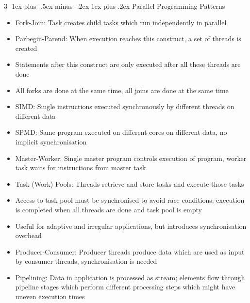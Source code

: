 \documentclass[10pt, landscape]{article}
\makeatletter
\renewcommand{\subsection}{\@startsection{subsection}{3}{0mm}%
                                {-1ex plus -.5ex minus -.2ex}%
                                {1ex plus .2ex}%
                                {\normalfont\small\bfseries}}%
\makeatother
\begin{document}
\begin{multicols*}{3}
\subsection{Parallel Programming Patterns}
\begin{itemize}
    \item Fork-Join: Task creates child tasks which run independently in parallel
    \item Parbegin-Parend: When execution reaches this construct, a set of threads is created
    \item Statements after this construct are only executed after all these threads are done
    \item All forks are done at the same time, all joins are done at the same time
    \item SIMD: Single instructions executed synchronously by different threads on different data
    \item SPMD: Same program executed on different cores on different data, no implicit synchronisation
    \item Master-Worker: Single master program controls execution of program, worker task waits for instructions from master task
    \item Task (Work) Pools: Threads retrieve and store tasks and execute those tasks
    \item Access to task pool must be synchronised to avoid race conditions; execution is completed when all threads are done and task pool is empty
    \item Useful for adaptive and irregular applications, but introduces synchronisation overhead
    \item Producer-Consumer: Producer threads produce data which are used as input by consumer threads, synchronisation is needed
    \item Pipelining: Data in application is processed as stream; elements flow through pipeline stages which perform different processing steps which might have uneven execution times
\end{itemize}


\end{multicols*}
\end{document}
